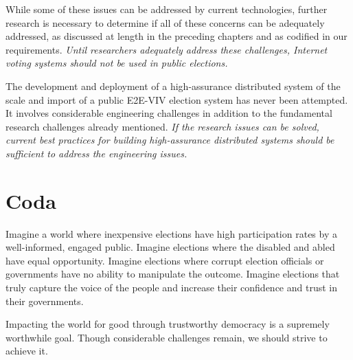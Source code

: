 While some of these issues can be addressed by current technologies,
further research is necessary to determine if all of these concerns
can be adequately addressed, as discussed at length in the preceding
chapters and as codified in our requirements. \emph{Until researchers
  adequately address these challenges, Internet voting systems should
  not be used in public elections.}


The development and deployment of a high-assurance distributed system
of the scale and import of a public E2E-VIV election system has never
been attempted. It involves considerable engineering challenges in
addition to the fundamental research challenges already
mentioned. \emph{If the research issues can be solved, current best
practices for building high-assurance distributed systems should be
sufficient to address the engineering issues.}

\section*{Coda}

Imagine a world where inexpensive elections have high participation
rates by a well-informed, engaged public. Imagine elections where the
disabled and abled have equal opportunity. Imagine elections where
corrupt election officials or governments have no ability to
manipulate the outcome. Imagine elections that truly capture the voice
of the people and increase their confidence and trust in their
governments.

Impacting the world for good through trustworthy democracy is a
supremely worthwhile goal. Though considerable challenges remain, we
should strive to achieve it.
